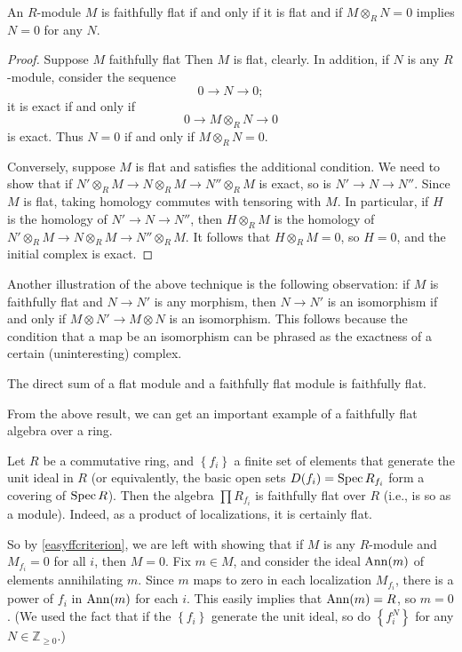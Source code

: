 \begin{proposition}  \label{easyffcriterion}
An $R$-module $M$ is faithfully flat if and only if it is flat and if $M
\otimes_R N = 0$ implies $N=0$ for any $N$.
\end{proposition} 
\begin{proof} Suppose $M$ faithfully flat
Then $M$ is flat, clearly. In addition, if $N$ is any $R$-module, consider the
sequence
\[ 0 \to N \to 0;  \]
it is exact if and only if
\[ 0 \to M \otimes_R N \to 0  \]
is exact. Thus $N=0$ if and only if $M \otimes_R N = 0$.

Conversely, suppose $M$ is flat and satisfies the additional condition. We
need to show that if $N'
\otimes_R M \to N \otimes_R M \to N'' \otimes_R M$ is exact, so is $N' \to N
\to N''$. Since $M$ is flat, taking homology commutes with tensoring with $M$.
In particular, if $H$ is the homology of $N' \to N \to N''$, then $H \otimes_R
M$ is the homology of 
$N'
\otimes_R M \to N \otimes_R M \to N'' \otimes_R M$. It follows that $H
\otimes_R M = 0$, so $H=0$, and the initial complex is exact.
\end{proof} 

\begin{example} 
Another illustration of the above technique is the following observation: if
$M$ is faithfully flat and $N \to N'$ is any morphism, then $N \to N'$ is an
isomorphism if and only if $M \otimes N' \to M \otimes N$ is an isomorphism.
This follows because the condition that a map be an isomorphism can be phrased
as the exactness of a certain (uninteresting) complex.
\end{example} 
\begin{exercise} 
The direct sum of a flat module and a faithfully flat module is faithfully flat.
\end{exercise} 


From the above result, we can get an important example of a faithfully flat
algebra over a ring.
\begin{example} 
Let $R$ be a commutative ring, and $\left\{f_i\right\}$ a finite set of
elements that generate the unit ideal in $R$ (or equivalently, the basic open
sets $D(f_i) = \operatorname{Spec} R_{f_i}$ form a covering of $\operatorname{Spec} R$). 
Then the algebra $\prod R_{f_i}$ is faithfully flat over $R$ (i.e., is so as a
module). Indeed, as a
product of localizations, it is certainly flat.

So by \cref{easyffcriterion}, we are left with showing that if $M$ is any
$R$-module and $M_{f_i} =0 $ for all $i$, then $M = 0$. 
Fix $m \in M$, and consider the ideal $\operatorname{Ann}(m)$ of elements annihilating $m$.
Since $m$ maps to zero in each localization $M_{f_i}$, there is a power of
$f_i$ in $\operatorname{Ann}(m)$ for each $i$. 
This easily implies that $\operatorname{Ann}(m) = R$, so $m=0$. (We used the fact that if the
$\left\{f_i\right\}$ generate the unit ideal, so do $\left\{f_i^N\right\}$ for
any $N \in \mathbb{Z}_{\geq 0}$.)
\end{example} 


